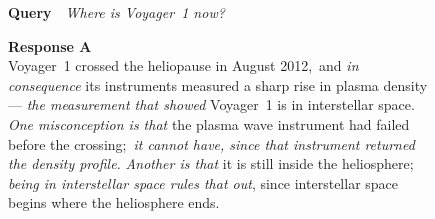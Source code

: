 \begin{figure}[t]
\centering
\footnotesize
\newcommand{\mtvx}{11.5mm}
\newcommand{\mtvy}{9.2mm}
\newcommand{\mtvbox}{21mm}
\newcommand{\dscale}{12}
\newcommand{\dbars}[2]{%
  \begin{tikzpicture}[x=1mm, y=1mm]
    \def\zx{#1}\def\rh{3.4}
    \node[font=\scriptsize\bfseries,anchor=west] at (0,2.6) {$\Delta_r$ (change in $\Lambda$)};
    \foreach \i/\lab/\v/\neg in {#2}
    {
      \pgfmathsetmacro{\y}{-\i*\rh}
      \pgfmathsetmacro{\w}{\v*\dscale}
      \node[anchor=west,font=\scriptsize] at (0,\y) {\lab};
      \ifnum\neg=1
        \fill[red!30!white,draw=red!60!black,line width=0.3pt]
             (\zx+\w,\y-1.1) rectangle (\zx,\y+1.1);
        \node[anchor=west,font=\scriptsize] at (\zx+0.8,\y)
             {$\pgfmathprintnumber[fixed,fixed zerofill,precision=2]{\v}$};
      \else
        \fill[blue!35!white,draw=blue!55!black,line width=0.3pt]
             (\zx,\y-1.1) rectangle (\zx+\w,\y+1.1);
        \node[anchor=west,font=\scriptsize] at (\zx+\w+0.8,\y)
             {$+\pgfmathprintnumber[fixed,fixed zerofill,precision=2]{\v}$};
      \fi
    }
    \draw[black!60,line width=0.4pt] (\zx,-0.8) -- (\zx,-4*\rh-1.6);
    \path (0,-4*\rh-1.6) -- (68,-4*\rh-1.6);
  \end{tikzpicture}}

{\scriptsize\textbf{Query}\ \ \emph{Where is Voyager~1 now?}}

\smallskip
\noindent
\begin{minipage}[t]{0.495\textwidth}\centering
  \colorbox{blue!4}{\parbox[t][\mtvbox][t]{\dimexpr\linewidth-2\fboxsep\relax}{%
  \textbf{\textcolor{blue!55!black}{Response A}}\\[1pt]
  \scriptsize
  Voyager~1 crossed the heliopause in August 2012,\, and \emph{in consequence} its
  instruments measured a sharp rise in plasma density\, --- \emph{the measurement that
  showed} Voyager~1 is in interstellar space.\, \emph{One misconception is that} the
  plasma wave instrument had failed before the crossing;\, \emph{it cannot have, since
  that instrument returned the density profile.} \emph{Another is that} it is still inside the
  heliosphere;\, \emph{being in interstellar space rules that out}, since interstellar
  space begins where the heliosphere ends.\strut}}


\end{minipage}
\end{figure}
